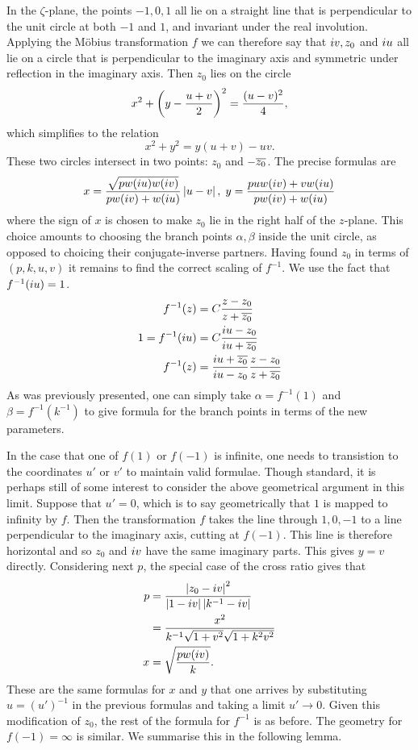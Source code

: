 In the $ζ$-plane, the points $-1,0,1$ all lie on a straight line that is perpendicular to the unit circle at both $-1$ and $1$, and invariant under the real involution. Applying the M\"obius transformation $f$ we can therefore say that $i v, z_0$ and $i u$ all lie on a circle that is perpendicular to the imaginary axis and symmetric under reflection in the imaginary axis. Then $z_0$ lies on the circle
\[
x^2 + \left( y - \frac{u+v}{2} \right)^2 = \frac{(u-v)^2}{4},
\]
which simplifies to the relation
\[
x^2 + y^2 = y(u+v) - uv.
\]
These two circles intersect in two points: $z_0$ and $-\overline{z_0}$. The precise formulas are
\[
x = \frac{\sqrt{pw(i u)w(i v)}}{pw(i v) + w(i u)} \left|u-v\right|,\; y = \frac{puw(i v) + vw(i u)}{pw(i v) + w(i u)}
\]
where the sign of $x$ is chosen to make $z_0$ lie in the right half of the $z$-plane. This choice amounts to choosing the branch points $α,β$ inside the unit circle, as opposed to choicing their conjugate-inverse partners. Having found $z_0$ in terms of $(p,k,u,v)$ it remains to find the correct scaling of $f^{-1}$. We use the fact that $f^{-1}(i u) = 1$.
\begin{align*}
f^{-1}(z) &= C \frac{z-z_0}{z + \overline{z_0}} \\
1 = f^{-1}(i u) &= C \frac{i u - z_0}{i u + \overline{z_0}} \\
f^{-1}(z) &=  \frac{i u + \overline{z_0}}{i u - z_0} \frac{z-z_0}{z + \overline{z_0}}
\end{align*}
As was previously presented, one can simply take $α = f^{-1}(1)$ and $β = f^{-1}(k^{-1})$ to give formula for the branch points in terms of the new parameters.

In the case that one of $f(1)$ or $f(-1)$ is infinite, one needs to transistion to the coordinates $u'$ or $v'$ to maintain valid formulae. Though standard, it is perhaps still of some interest to consider the above geometrical argument in this limit. Suppose that $u' = 0$, which is to say geometrically that $1$ is mapped to infinity by $f$. Then the transformation $f$ takes the line through $1,0,-1$ to a line perpendicular to the imaginary axis, cutting at $f(-1)$. This line is therefore horizontal and so $z_0$ and $i v$ have the same imaginary parts. This gives $y=v$ directly. Considering next $p$, the special case of the cross ratio gives that
\begin{align}
p
&= \frac{\left|z_0 -i v\right|^2}{\left|1-i v\right|\left|k^{-1}-i v\right|} \\
&= \frac{x^2}{k^{-1}\sqrt{1+v^2}\sqrt{1+k^2 v^2}} \\
x &= \sqrt{\frac{p w(i v)}{k}}.
\end{align}
These are the same formulas for $x$ and $y$ that one arrives by substituting $u = (u')^{-1}$ in the previous formulas and taking a limit $u' \to 0$. Given this modification of $z_0$, the rest of the formula for $f^{-1}$ is as before. The geometry for $f(-1) = \infty$ is similar. We summarise this in the following lemma.

